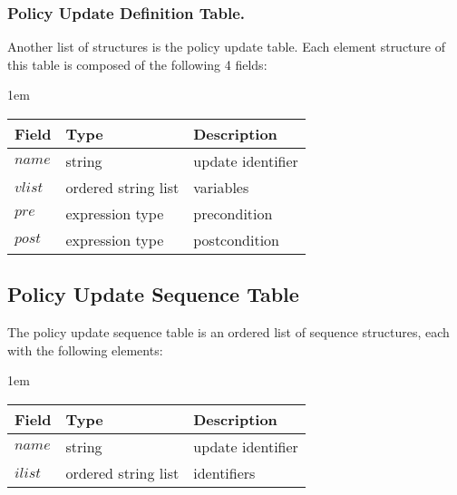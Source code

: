 \documentclass[global,twocolumn,final]{svjour}
\newenvironment{vquote}
  {\begin{list}{}{\leftmargin 1em}\item[]}
  {\end{list}}
\begin{document}
      \subsubsection{Policy Update Definition Table.}

        Another list of structures is the policy update table. Each element
        structure of this table is composed of the following 4 fields:

        \begin{vquote}
          \begin{tabular}[t]{|l|l|l|}
            \hline
            \textbf{Field} & \textbf{Type} & \textbf{Description} \\
            \hline
            $name$ & string & update identifier \\
            \hline
            $vlist$ & ordered string list & variables \\
            \hline
            $pre$ & expression type & precondition \\
            \hline
            $post$ & expression type & postcondition \\
            \hline
          \end{tabular}
        \end{vquote}

    \subsection{Policy Update Sequence Table}

      The policy update sequence table is an ordered list of sequence
      structures, each with the following elements:

      \begin{vquote}
        \begin{tabular}[t]{|l|l|l|}
          \hline
          \textbf{Field} & \textbf{Type} & \textbf{Description} \\
          \hline
          $name$ & string & update identifier \\
          \hline
          $ilist$ & ordered string list & identifiers \\
          \hline
        \end{tabular}
      \end{vquote}
\end{document}

